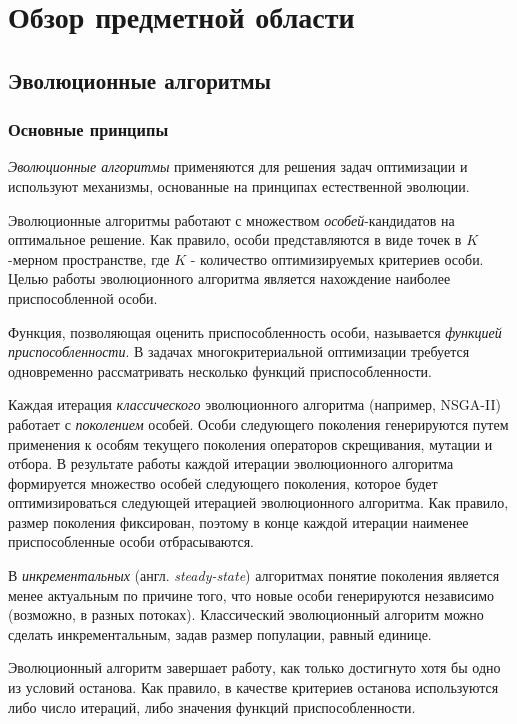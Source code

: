 \chapter{Обзор предметной области}
\label{chapter1}

\section{Эволюционные алгоритмы}
\label{evo_algs}

\subsection{Основные принципы}
\textit{Эволюционные алгоритмы} применяются для решения задач оптимизации и используют механизмы, 
основанные на принципах естественной эволюции.\cite{petrova_evo1} 

Эволюционные алгоритмы работают с множеством \textit{особей}-кандидатов на оптимальное решение. 
Как правило, особи представляются в виде точек в $K$-мерном пространстве, где $K$ - количество 
оптимизируемых критериев особи. Целью работы эволюционного алгоритма является нахождение наиболее 
приспособленной особи.

Функция, позволяющая оценить приспособленность особи, называется \textit{функцией приспособленности}.
В задачах многокритериальной оптимизации требуется одновременно рассматривать несколько функций 
приспособленности.

Каждая итерация \textit{классического} эволюционного алгоритма (например, NSGA-II) работает с \textit{поколением} 
особей. Особи следующего поколения генерируются путем применения к особям текущего поколения операторов 
скрещивания, мутации и отбора. В результате работы каждой итерации эволюционного алгоритма формируется 
множество особей следующего поколения, которое будет оптимизироваться следующей итерацией эволюционного 
алгоритма. Как правило, размер поколения фиксирован, поэтому в конце каждой итерации наименее приспособленные 
особи отбрасываются.

В \textit{инкрементальных} (англ. \textit{steady-state}) алгоритмах понятие поколения является менее актуальным 
по причине того, что новые особи генерируются независимо (возможно, в разных потоках). Классический эволюционный 
алгоритм можно сделать инкрементальным, задав размер популации, равный единице.

Эволюционный алгоритм завершает работу, как только достигнуто хотя бы одно из условий останова.
Как правило, в качестве критериев останова используются либо число итераций, либо значения функций
приспособленности.

